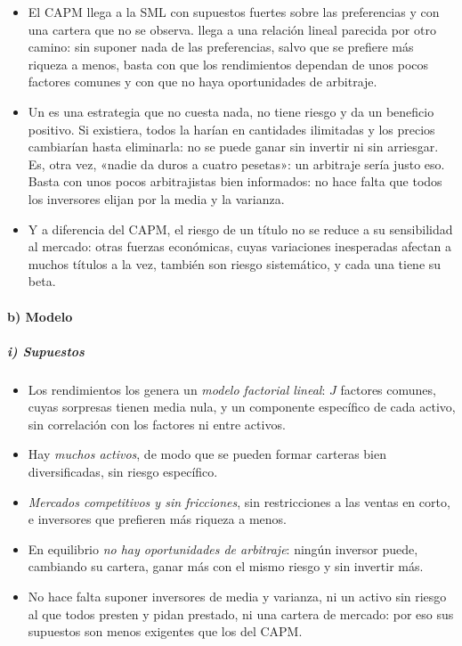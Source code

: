 \documentclass[11pt]{article}
\begin{document}
\begin{itemize}
\item El CAPM llega a la SML con supuestos fuertes sobre las preferencias y con una cartera que no se observa. \textcite{Ross1976Arbitrage} llega a una relación lineal parecida por otro camino: sin suponer nada de las preferencias, salvo que se prefiere más riqueza a menos, basta con que los rendimientos dependan de unos pocos factores comunes y con que no haya oportunidades de arbitraje.
\item Un  es una estrategia que no cuesta nada, no tiene riesgo y da un beneficio positivo. Si existiera, todos la harían en cantidades ilimitadas y los precios cambiarían hasta eliminarla: no se puede ganar sin invertir ni sin arriesgar. Es, otra vez, «nadie da duros a cuatro pesetas»: un arbitraje sería justo eso. Basta con unos pocos arbitrajistas bien informados: no hace falta que todos los inversores elijan por la media y la varianza.
\item Y a diferencia del CAPM, el riesgo de un título no se reduce a su sensibilidad al mercado: otras fuerzas económicas, cuyas variaciones inesperadas afectan a muchos títulos a la vez, también son riesgo sistemático, y cada una tiene su beta.
\end{itemize}

\paragraph{b) Modelo}

\subparagraph{i) Supuestos}

\begin{itemize}
\item Los rendimientos los genera un \emph{modelo factorial lineal}: $J$ factores comunes, cuyas sorpresas tienen media nula, y un componente específico de cada activo, sin correlación con los factores ni entre activos.
\item Hay \emph{muchos activos}, de modo que se pueden formar carteras bien diversificadas, sin riesgo específico.
\item \emph{Mercados competitivos y sin fricciones}, sin restricciones a las ventas en corto, e inversores que prefieren más riqueza a menos.
\item En equilibrio \emph{no hay oportunidades de arbitraje}: ningún inversor puede, cambiando su cartera, ganar más con el mismo riesgo y sin invertir más.
\item No hace falta suponer inversores de media y varianza, ni un activo sin riesgo al que todos presten y pidan prestado, ni una cartera de mercado: por eso sus supuestos son menos exigentes que los del CAPM.
\end{itemize}
\end{document}
